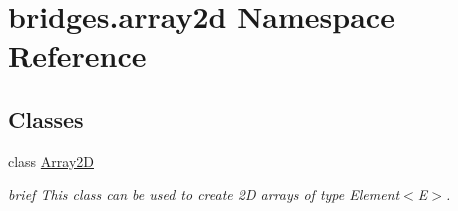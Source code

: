 \hypertarget{namespacebridges_1_1array2d}{}\section{bridges.\+array2d Namespace Reference}
\label{namespacebridges_1_1array2d}
\subsection*{Classes}
\begin{DoxyCompactItemize}
\item 
class \hyperlink{classbridges_1_1array2d_1_1_array2_d}{Array2D}
\begin{DoxyCompactList}\small\item\em brief This class can be used to create 2D arrays of type Element$<$\+E$>$. \end{DoxyCompactList}\end{DoxyCompactItemize}
